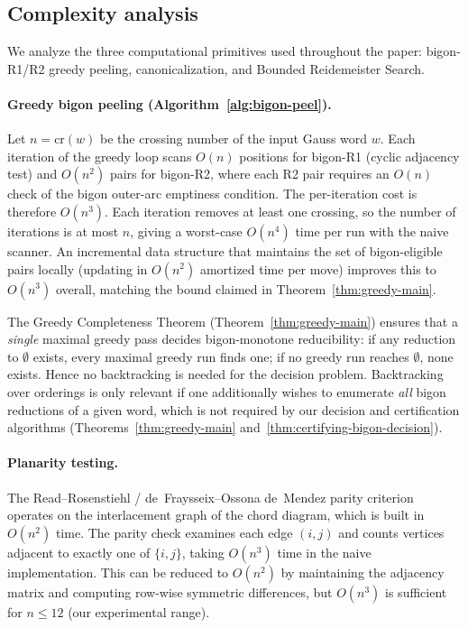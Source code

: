 
\subsection{Complexity analysis}

We analyze the three computational primitives used throughout the paper:
bigon-R1/R2 greedy peeling, canonicalization, and Bounded Reidemeister Search.

\paragraph{Greedy bigon peeling (Algorithm~\ref{alg:bigon-peel}).}
Let $n = \mathrm{cr}(w)$ be the crossing number of the input Gauss word
$w$.  Each iteration of the greedy loop scans $O(n)$ positions for
bigon-R1 (cyclic adjacency test) and $O(n^2)$ pairs for bigon-R2, where
each R2 pair requires an $O(n)$ check of the bigon outer-arc emptiness
condition.  The per-iteration cost is therefore $O(n^3)$.  Each iteration
removes at least one crossing, so the number of iterations is at most
$n$, giving a worst-case $O(n^4)$ time per run with the naive scanner.
An incremental data structure that maintains the set of bigon-eligible
pairs locally (updating in $O(n^2)$ amortized time per move) improves
this to $O(n^3)$ overall, matching the bound claimed in
Theorem~\ref{thm:greedy-main}.

The Greedy Completeness Theorem (Theorem~\ref{thm:greedy-main}) ensures
that a \emph{single} maximal greedy pass decides bigon-monotone
reducibility: if any reduction to $\emptyset$ exists, every maximal
greedy run finds one; if no greedy run reaches $\emptyset$, none exists.
Hence no backtracking is needed for the decision problem.  Backtracking
over orderings is only relevant if one additionally wishes to enumerate
\emph{all} bigon reductions of a given word, which is not required by
our decision and certification algorithms (Theorems~\ref{thm:greedy-main}
and~\ref{thm:certifying-bigon-decision}).

\paragraph{Planarity testing.}
The Read--Rosenstiehl / de~Fraysseix--Ossona de~Mendez parity criterion
operates on the interlacement graph of the chord diagram, which is built
in $O(n^2)$ time.  The parity check examines each edge $(i,j)$ and
counts vertices adjacent to exactly one of $\{i,j\}$, taking $O(n^3)$
time in the naive implementation.  This can be reduced to $O(n^2)$ by
maintaining the adjacency matrix and computing row-wise symmetric
differences, but $O(n^3)$ is sufficient for $n \leq 12$ (our
experimental range).

